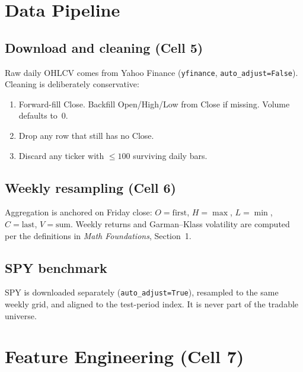 \documentclass[11pt]{article}
\newcommand{\code}[1]{\texttt{#1}}
\begin{document}
\section{Data Pipeline}\label{sec:data}

\subsection{Download and cleaning (Cell 5)}

Raw daily OHLCV comes from Yahoo Finance (\code{yfinance}, \code{auto\_adjust=False}).
Cleaning is deliberately conservative:

\begin{enumerate}
\item Forward-fill Close.  Backfill Open/High/Low from Close if missing.  Volume defaults to~0.
\item Drop any row that still has no Close.
\item Discard any ticker with $\le 100$ surviving daily bars.
\end{enumerate}

\subsection{Weekly resampling (Cell 6)}

Aggregation is anchored on Friday close:
$O=\text{first}$, $H=\max$, $L=\min$, $C=\text{last}$, $V=\text{sum}$.
Weekly returns and Garman--Klass volatility are computed per the
definitions in \textit{Math Foundations}, Section~1.

\subsection{SPY benchmark}

SPY is downloaded separately (\code{auto\_adjust=True}), resampled to the same
weekly grid, and aligned to the test-period index.  It is never part of the
tradable universe.

\section{Feature Engineering (Cell 7)}\label{sec:features}
\end{document}
